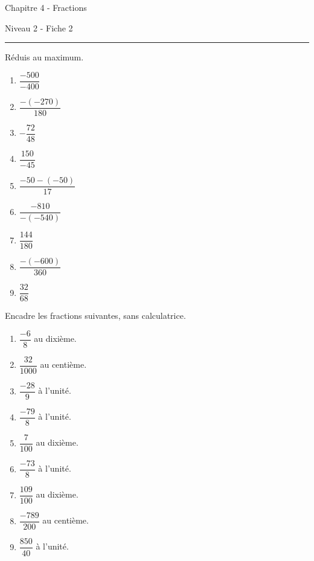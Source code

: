 \documentclass[12pt,parskip=half-, twoside=semi]{scrartcl}
\begin{document}
\newpage
\begin{center}
  \bfseries
  \begin{Huge}
    Chapitre 4 - Fractions
  \end{Huge}
  \smallbreak
  \begin{large}
    Niveau 2  - Fiche 2
  \end{large}
  \smallbreak
  \rule[10pt]{.5\linewidth}{1 pt}
\end{center}

\setcounter{exercise}{0}

\begin{exercise}
  Réduis au maximum.
  \begin{enumerate}[cols=3]
   \item \(\dfrac{-500}{-400}\)
   \item \(\dfrac{-(-270)}{180}\)
   \item \(-\dfrac{72}{48}\)
   \item \(\dfrac{150}{-45}\)
   \item \(\dfrac{-50-(-50)}{17}\)
   \item \(\dfrac{-810}{-(-540)}\)
   \item \(\dfrac{144}{180}\)
   \item \(\dfrac{-(-600)}{360}\)
   \item \(\dfrac{32}{68}\)
  \end{enumerate}
\end{exercise}

\begin{exercise}
  Encadre les fractions suivantes, sans calculatrice.
  \begin{enumerate}[cols=3]
    \item $\dfrac{-6}{8}$ au dixième.
    \item $\dfrac{32}{1000}$ au centième.
    \item $\dfrac{-28}{9}$ à l'unité.
    \item $\dfrac{-79}{8}$ à l'unité.
    \item $\dfrac{7}{100}$ au dixième.
    \item $\dfrac{-73}{8}$ à l'unité.
    \item $\dfrac{109}{100}$ au dixième.
    \item $\dfrac{-789}{200}$ au centième.
    \item $\dfrac{850}{40}$ à l'unité.
  \end{enumerate}
\end{exercise}
\end{document}
